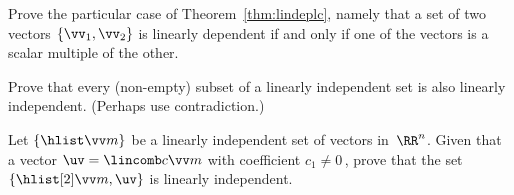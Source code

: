 \begin{exercise} \label{ex:lindeplc} 
Prove the particular case of Theorem~\ref{thm:lindeplc}, namely that a set of two vectors \(\{\vv_1,\vv_2\}\) is linearly dependent if and only if one of the vectors is a scalar multiple of the other.
\end{exercise}




\begin{exercise} \label{ex:} 
Prove that every (non-empty) subset of a linearly independent set is also linearly independent.  (Perhaps use contradiction.)
\end{exercise}





\begin{exercise} \label{ex:} 
Let \(\{\hlist\vv m\}\) be a linearly independent set of vectors in~\(\RR^n\).
Given that a vector \(\uv=\lincomb c\vv m\) with coefficient \(c_1\neq0\)\,, prove that the set \(\{\hlist[2]\vv m,\uv\}\) is linearly independent.
\end{exercise}




